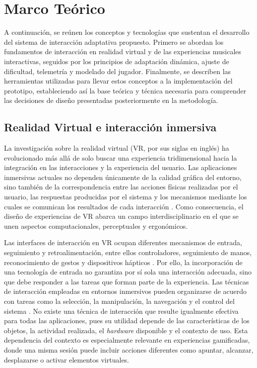 \chapter{Marco Teórico}
A continuación, se reúnen los conceptos y tecnologías que sustentan el 
desarrollo del sistema de interacción adaptativa propuesto. 
Primero se abordan los fundamentos de interacción en realidad virtual y 
de las experiencias musicales interactivas, seguidos por los principios 
de adaptación dinámica, ajuste de dificultad, telemetría y modelado del 
jugador. Finalmente, se describen las herramientas utilizadas para 
llevar estos conceptos a la implementación del prototipo, estableciendo 
así la base teórica y técnica necesaria para comprender las decisiones de 
diseño presentadas posteriormente en la metodología.


\section{Realidad Virtual e interacción inmersiva}
La investigación sobre la realidad virtual (VR, 
por sus siglas en inglés) ha evolucionado más 
allá de solo buscar una experiencia tridimensional 
hacia la integración en las interacciones y la 
experiencia del usuario. Las aplicaciones 
inmersivas actuales no dependen únicamente de la 
calidad gráfica del entorno, sino también de la 
correspondencia entre las acciones físicas 
realizadas por el usuario, las respuestas 
producidas por el sistema y los mecanismos 
mediante los cuales se comunican los resultados 
de cada interacción \cite{chen2024interfaces,spittle2023interaction,yeo2024interfaces}.
Como consecuencia, el diseño de experiencias de 
VR abarca un campo interdisciplinario en el que 
se unen aspectos computacionales, perceptuales y 
ergonómicos.

Las interfaces de interacción en VR ocupan 
diferentes mecanismos de entrada, seguimiento y 
retroalimentación, entre ellos controladores, 
seguimiento de manos, reconocimiento de gestos y 
dispositivos hápticos \cite{chen2024interfaces}. 
Por ello, la incorporación de una tecnología de 
entrada no garantiza por sí sola una interacción 
adecuada, sino que debe responder a las tareas 
que forman parte de la experiencia. Las técnicas 
de interacción empleadas en entornos inmersivos 
pueden organizarse de acuerdo con tareas como la 
selección, la manipulación, la navegación y el 
control del sistema \cite{spittle2023interaction}.
No existe una técnica de interacción que resulte 
igualmente efectiva para todas las aplicaciones, 
pues su utilidad depende de las características 
de los objetos, la actividad realizada, el 
\textit{hardware} disponible y el contexto de uso. 
Esta dependencia del contexto es especialmente 
relevante en experiencias gamificadas, donde una 
misma sesión puede incluir acciones diferentes 
como apuntar, alcanzar, desplazarse o activar 
elementos virtuales.

